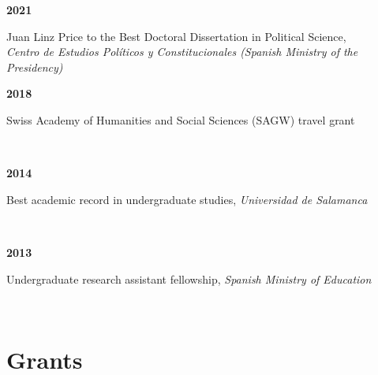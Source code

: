 \documentclass[a4paper, 12pt]{article}
\begin{document}
\begin{minipage}[t]{0.1\textwidth}
\textbf{2021}
\end{minipage}\hfill\begin{minipage}[t]{0.9\textwidth}
Juan Linz Price to the Best Doctoral Dissertation in Political Science,\\\textit{Centro de Estudios Políticos y Constitucionales (Spanish Ministry of the Presidency)}\\\vspace{-8pt}
\end{minipage}
\begin{minipage}[t]{0.1\textwidth}
\textbf{2018}
\end{minipage}\hfill\begin{minipage}[t]{0.9\textwidth}
Swiss Academy of Humanities and Social Sciences (SAGW) travel grant
\end{minipage}\\
\begin{minipage}[t]{0.1\textwidth}
\textbf{2014}
\end{minipage}\hfill\begin{minipage}[t]{0.9\textwidth}
Best academic record in undergraduate studies, {\it Universidad de Salamanca}
\end{minipage}\\
\begin{minipage}[t]{0.1\textwidth}
\textbf{2013}
\end{minipage}\hfill\begin{minipage}[t]{0.9\textwidth}
Undergraduate research assistant fellowship, {\it Spanish Ministry of Education}
\end{minipage}\\

\section*{Grants}
\end{document}
